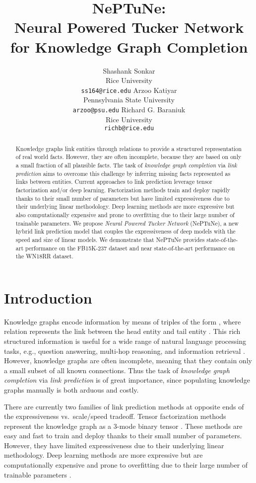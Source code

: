\documentclass[11pt]{article}
\title{\bf {\LARGE NePTuNe:} \\ Neural Powered Tucker Network \\ for Knowledge Graph Completion}
\author{Shashank Sonkar \\
  Rice University \\
  {\tt ss164@rice.edu}
  \And
  Arzoo Katiyar \\
  Pennsylvania State University \\
  {\tt arzoo@psu.edu} 
  \And
  Richard G. Baraniuk \\
  Rice University \\
  {\tt richb@rice.edu}
}
\date{}
\begin{document}
\maketitle
\begin{abstract}
    Knowledge graphs link entities through relations to provide a structured representation of real world facts. However, they are often incomplete, because they are based on only a small fraction of all plausible facts. The task of {\em knowledge graph completion} via {\em link prediction} aims to overcome this challenge by inferring missing facts represented as links between entities. Current approaches to link prediction leverage tensor factorization and/or deep learning. 
    Factorization methods train and deploy rapidly thanks to their small number of parameters but have limited expressiveness due to their underlying linear methodology.
    Deep learning methods are more expressive but also computationally expensive and prone to overfitting due to their large number of trainable parameters. 
    We propose \textit{Neural Powered Tucker Network} (NePTuNe), a new hybrid link prediction model that couples the expressiveness of deep models with the speed and size of linear models. 
    We demonstrate that NePTuNe provides state-of-the-art performance on the FB15K-237 dataset and near state-of-the-art performance on the WN18RR dataset.
\end{abstract}
\vspace{0.1cm}

\section{Introduction}
Knowledge graphs encode information by means of triples of the form , where relation  represents the link between the head entity  and tail entity . This rich structured information is useful for a wide range of natural language processing tasks, e.g., question answering, multi-hop reasoning, and information retrieval \cite{hao2017end,zhang2018variational,dietz2018utilizing}. However, knowledge graphs are often incomplete, meaning that they contain only a small subset of all known connections. Thus the task of {\em knowledge graph completion} via {\em link prediction} is of great importance, since populating knowledge graphs manually is both arduous and costly.

There are currently two families of link prediction methods at opposite ends of the expressiveness vs.\ scale/speed tradeoff.
Tensor factorization methods represent the knowledge graph as a 3-mode binary tensor \cite{nickel2011three,yang2014embedding,trouillon2017knowledge,balavzevic2019tucker}. 
These methods are easy and fast to train and deploy thanks to their small number of parameters.
However, they have limited expressiveness due to their underlying linear methodology.  
Deep learning methods are more expressive but are computationally expensive and prone to overfitting due to their large number of trainable parameters  \cite{nickel2011three,socher2013reasoning}. 
\end{document}
